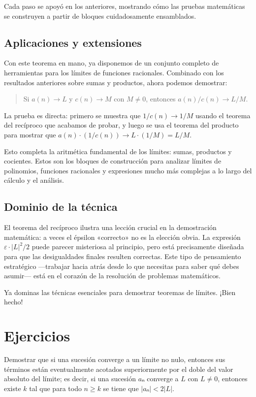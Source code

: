 Cada paso se apoyó en los anteriores, mostrando cómo las pruebas matemáticas
se construyen a partir de bloques cuidadosamente ensamblados.

\subsection{Aplicaciones y extensiones}

Con este teorema en mano, ya disponemos de un conjunto completo de
herramientas para los límites de funciones racionales. Combinado con los
resultados anteriores sobre sumas y productos, ahora podemos demostrar:

\begin{quote}
  Si $a(n) \to L$ y $c(n) \to M$ con $M \neq 0$, entonces
  $a(n)/c(n) \to L/M$.
\end{quote}

La prueba es directa: primero se muestra que $1/c(n) \to 1/M$ usando el
teorema del recíproco que acabamos de probar, y luego se usa el teorema del
producto para mostrar que $a(n) \cdot (1/c(n)) \to L \cdot (1/M) = L/M$.

Esto completa la aritmética fundamental de los límites: sumas, productos y
cocientes. Estos son los bloques de construcción para analizar límites de
polinomios, funciones racionales y expresiones mucho más complejas a lo largo
del cálculo y el análisis.

\subsection{Dominio de la técnica}

El teorema del recíproco ilustra una lección crucial en la demostración
matemática: a veces el épsilon «correcto» no es la elección obvia. La
expresión $\varepsilon \cdot |L|^2/2$ puede parecer misteriosa al principio,
pero está precisamente diseñada para que las desigualdades finales resulten
correctas. Este tipo de pensamiento estratégico —trabajar hacia atrás desde
lo que necesitas para saber qué debes asumir— está en el corazón de la
resolución de problemas matemáticos.

Ya dominas las técnicas esenciales para demostrar teoremas de límites.
¡Bien hecho!

\section{Ejercicios}

\begin{ejercicio}
  Demostrar que si una sucesión converge a un límite no nulo, entonces
  sus términos están eventualmente acotados superiormente por el doble
  del valor absoluto del límite; es decir, si una sucesión $aₙ$ converge a
  $L$ con $L ≠ 0$, entonces existe $k$ tal que para todo $n ≥ k$ se tiene que
  $|aₙ| < 2|L|$.
\end{ejercicio}

